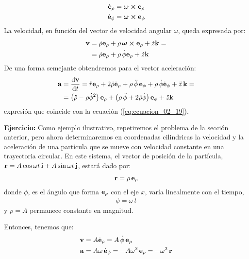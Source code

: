 \documentclass[12pt]{article}
\begin{document}
\begin{align}
\dot{\vb{e}}_{\rho} &= \bm{\omega} \cp \vb{e}_{\rho} \label{eq:ecuacion_02_23} \\
\dot{\vb{e}}_{\phi} &= \bm{\omega} \cp \vb{e}_{\phi} \label{eq:ecuacion_02_24}
\end{align}
La velocidad, en función del vector de velocidad angular $\omega$, queda expresada por:
\begin{align}
\begin{aligned}
\vb{v} &= \dot{\rho} \vb{e}_{\rho} + \rho \, \bm{\omega} \cp \vb{e}_{\rho} + \dot{z} \vb{k} = \\
&= \dot{\rho} \vb{e}_{\rho} + \rho \, \dot{\phi} \vb{e}_{\rho} + \dot{z} \vb{k}
\end{aligned}
\label{eq:ecuacion_02_25}
\end{align}
De una forma semejante obtendremos para el vector aceleración:
\begin{align}
\begin{aligned}
\vb{a} &= \dv{\vb{v}}{t} = \ddot{r} \vb{e}_{\rho} + 2 \dot{\rho} \dot{\vb{e}}_{\rho} + \rho \, \ddot{\phi} \, \vb{e}_{\phi} + \rho \, \dot{\phi} \dot{\vb{e}}_{\phi} + \ddot{z} \, \vb{k} = \\
&= \left( \ddot{\rho} - \rho \dot{\phi}^{2} \right) \vb{e}_{\rho} + \left( \rho \, \ddot{\phi} + 2 \dot{\rho} \dot{\phi} \right) \vb{e}_{\phi} + \ddot{z} \vb{k}
\end{aligned}
\label{eq:ecuacion_02_26}
\end{align}
expresión que coincide con la ecuación (\ref{eq:ecuacion_02_19}).
\par
\noindent
\textbf{Ejercicio: } Como ejemplo ilustrativo, repetiremos el problema de la sección anterior, pero ahora determinaremos en coordenadas cilindricas la velocidad y la aceleración de una partícula que se mueve con velocidad constante en una trayectoria circular. En este sistema, el vector de posición de la partícula, 
$\vb{r} = A \cos \omega t \, \vb{i} +  A \sin \omega t \, \vb{j}$, estará dado por:
\begin{align}
\vb{r} = \rho \, \vb{e}_{\rho}
\label{eq:ecuacion_02_27}
\end{align}
donde $\phi$, es el ángulo que forma $\vb{e}_{\rho}$ con el eje $x$, varía linealmente con el tiempo, 
\begin{align*}
\phi = \omega \, t
\end{align*}
y $\rho = A$ permanece constante en magnitud. 
\par
Entonces, tenemos que:
\begin{align}
\vb{v} &= A \dot{\vb{e}}_{\rho} = A \, \dot{\phi} \, \vb{e}_{\rho} \label{eq:ecuacion_02_28} \\
\vb{a} &= A \omega \, \dot{\vb{e}}_{\phi} = - A \omega^{2} \, \vb{e}_{\rho} = - \omega^{2} \, \vb{r} \label{eq:ecuacion_02_29}
\end{align}
\end{document}
